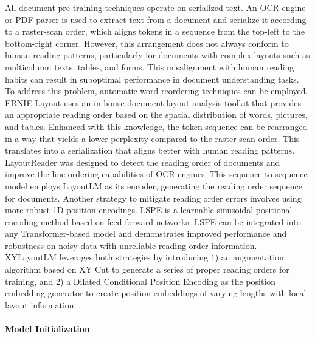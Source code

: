 All document pre-training techniques operate on serialized text. An \ac{OCR} engine or PDF parser is used to extract text from a document and serialize it according to a raster-scan order, which aligns tokens in a sequence from the top-left to the bottom-right corner. However, this arrangement does not always conform to human reading patterns, particularly for documents with complex layouts such as multicolumn texts, tables, and forms. This misalignment with human reading habits can result in suboptimal performance in document understanding tasks. To address this problem, automatic word reordering techniques can be employed. ERNIE-Layout \citep{peng2022ernie} uses an in-house document layout analysis toolkit that provides an appropriate reading order based on the spatial distribution of words, pictures, and tables. Enhanced with this knowledge, the token sequence can be rearranged in a way that yields a lower perplexity compared to the raster-scan order. This translates into a serialization that aligns better with human reading patterns. LayoutReader \citep{wang2021layoutreader} was designed to detect the reading order of documents and improve the line ordering capabilities of \ac{OCR} engines. This sequence-to-sequence model employs LayoutLM \citep{xu2020layoutlm} as its encoder, generating the reading order sequence for documents. Another strategy to mitigate reading order errors involves using more robust 1D position encodings. \ac{LSPE} \citep{wang2022simple} is a learnable sinusoidal positional encoding method based on feed-forward networks. \ac{LSPE} can be integrated into any Transformer-based model and demonstrates improved performance and robustness on noisy data with unreliable reading order information. XYLayoutLM \citet{} leverages both strategies by introducing 1) an augmentation algorithm based on XY Cut \citep{ha1995recursive} to generate a series of proper reading orders for training, and 2) a Dilated Conditional Position Encoding as the position embedding generator to create position embeddings of varying lengths with local layout information. 


\paragraph{Model Initialization} 

